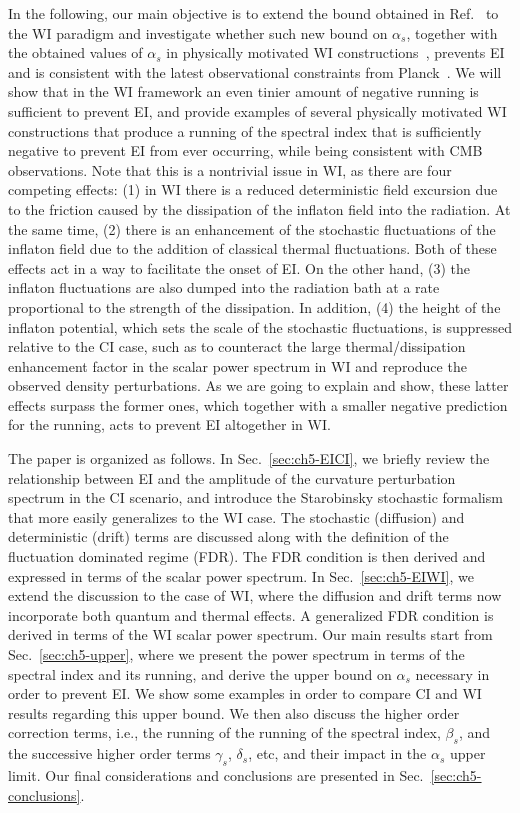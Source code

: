 In the following, our main objective is to extend the bound obtained in
Ref.~\cite{Kinney:2014jya} to the WI paradigm and investigate
whether such new bound on $\alpha_s$, together with the obtained
values of $\alpha_s$ in physically motivated WI constructions~\cite{Benetti:2016jhf,Das:2022ubr},
prevents EI  and is consistent with the latest observational constraints from Planck~\cite{Planck:2018jri}. We will show that in the WI framework an even tinier amount of negative running is sufficient to prevent EI, and provide examples of several physically motivated WI constructions that produce a running of the spectral index that is sufficiently negative to prevent EI from ever occurring, while being consistent with CMB observations.
Note that this is a nontrivial issue in WI, as there are four competing effects:   (1) in WI there is a reduced deterministic
field excursion due to the friction caused by the dissipation of the
inflaton field into the radiation. At the same time,  (2) there is an
enhancement of the stochastic fluctuations of the inflaton field due
to the addition of classical thermal fluctuations.  Both of these
effects act in a way to facilitate the onset of EI.  On the other hand, (3) the inflaton fluctuations are also dumped into the radiation bath at
a rate proportional to the strength of the dissipation.   In addition, (4) the
height of the inflaton potential, which sets the scale of the
stochastic fluctuations, is suppressed relative to the CI case, such
as to counteract the large thermal/dissipation enhancement factor in
the scalar power spectrum in WI and reproduce the observed density
perturbations. As we are going to explain and show, these latter effects surpass
the former ones, which together with a smaller negative prediction for
the running, acts to prevent EI altogether in WI.

The paper is organized as follows.  In Sec.~\ref{sec:ch5-EICI}, we briefly
review the relationship between EI and the
amplitude of the curvature perturbation spectrum in the CI scenario, and introduce the Starobinsky stochastic formalism that more easily generalizes to the WI case.  The stochastic (diffusion) and deterministic
(drift) terms are discussed along with the definition of the
fluctuation dominated regime (FDR).  The FDR condition is then derived
and expressed in terms of the scalar power spectrum.  In
Sec.~\ref{sec:ch5-EIWI}, we extend the discussion to the case of WI, where the
diffusion and drift terms now incorporate both quantum and thermal
effects.  A generalized FDR condition is derived in terms of the WI
scalar power spectrum.  Our main results start from Sec.~\ref{sec:ch5-upper},
where we present the power spectrum in terms of the spectral index and
its running, and derive the upper bound on $\alpha_s$ necessary in
order to prevent EI.  We show some examples in order to compare CI and
WI results regarding this upper bound.  We then also discuss the
higher order correction terms, i.e., the running of the running of the
spectral index, $\beta_s$, and the successive higher order terms
$\gamma_s$, $\delta_s$, etc, and their impact in the $\alpha_s$ upper
limit.  Our final considerations and conclusions are presented in
Sec.~\ref{sec:ch5-conclusions}.


